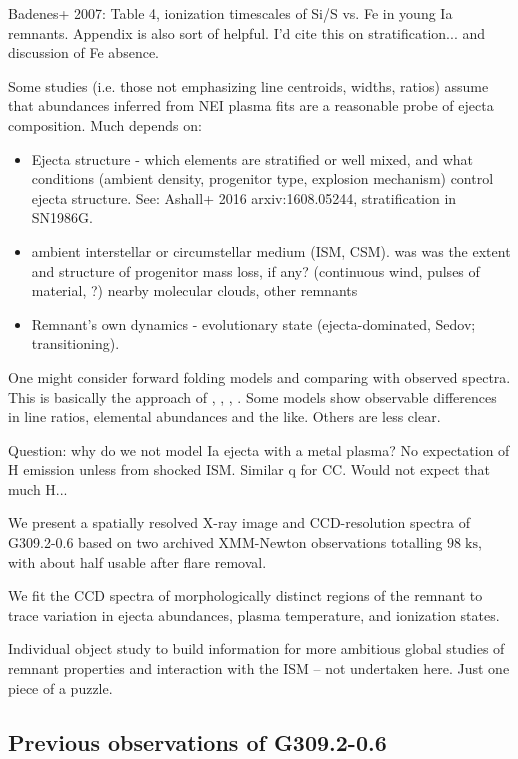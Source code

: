 \documentclass[preprint2,tighten,trackchanges]{aastex6}
\newcommand*{\mt}{\mathrm}
\newcommand*{\unit}[1]{\;\mt{#1}}  %
\begin{document}
Badenes+ 2007: Table 4, ionization timescales of Si/S vs. Fe in young Ia remnants.
Appendix is also sort of helpful.
I'd cite this on stratification... and discussion of Fe absence.

Some studies (i.e. those not emphasizing line centroids, widths, ratios) assume
that abundances inferred from NEI plasma fits are a reasonable probe of ejecta
composition.  Much depends on:
\begin{itemize}
    \item Ejecta structure - which elements are stratified or well mixed, and
        what conditions (ambient density, progenitor type, explosion mechanism)
        control ejecta structure.
        See: Ashall+ 2016 arxiv:1608.05244, stratification in SN1986G.
    \item ambient interstellar or circumstellar medium (ISM, CSM).
        was was the extent and structure of progenitor mass loss, if any?
        (continuous wind, pulses of material, ?)
        nearby molecular clouds, other remnants
    \item Remnant's own dynamics - evolutionary state (ejecta-dominated, Sedov;
        transitioning).
\end{itemize}

One might consider forward folding models and comparing with observed spectra.
This is basically the approach of \citet{hughes1995}, \citet{badenes2003},
\citet{rakowski2006}, \citet{patnaude2015}.
Some models show observable differences in line ratios, elemental abundances
and the like.  Others are less clear.

Question: why do we not model Ia ejecta with a metal plasma?  No expectation of
H emission unless from shocked ISM.
Similar q for CC.  Would not expect that much H...

We present a spatially resolved X-ray image and CCD-resolution spectra of
G309.2-0.6 based on two archived XMM-Newton observations totalling
$98 \unit{ks}$, with about half usable after flare removal.

We fit the CCD spectra of morphologically distinct regions of the remnant to
trace variation in ejecta abundances, plasma temperature, and ionization
states.

Individual object study to build information for more ambitious global studies
of remnant properties and interaction with the ISM -- not undertaken here.
Just one piece of a puzzle.

\subsection{Previous observations of G309.2-0.6}
\end{document}
